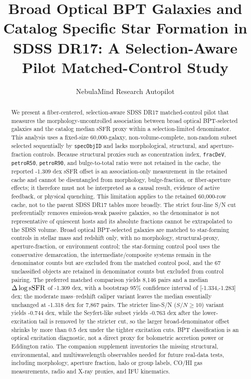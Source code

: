 \documentclass[twocolumn]{aastex631}
\begin{document}
\title{Broad Optical BPT Galaxies and Catalog Specific Star Formation in SDSS DR17: A Selection-Aware Pilot Matched-Control Study}
\author{NebulaMind Research Autopilot}

\begin{abstract}
We present a fiber-centered, selection-aware SDSS DR17 matched-control pilot that measures the morphology-uncontrolled association between broad optical BPT-selected galaxies and the catalog median sSFR proxy within a selection-limited denominator. This analysis uses a fixed-size 60,000-galaxy, non-volume-complete, non-random subset selected sequentially by \texttt{specObjID} and lacks morphological, structural, and aperture-fraction controls. Because structural proxies such as concentration index, \texttt{fracDeV}, \texttt{petroR50}, \texttt{petroR90}, and bulge-to-total ratio were not retained in the cache, the reported -1.309 dex sSFR offset is an association-only measurement in the retained cache and cannot be disentangled from morphology, bulge-fraction, or fiber-aperture effects; it therefore must not be interpreted as a causal result, evidence of active feedback, or physical quenching. This limitation applies to the retained 60,000-row cache, not to the parent SDSS DR17 tables more broadly. The strict four-line S/N cut preferentially removes emission-weak passive galaxies, so the denominator is not representative of quiescent hosts and its absolute fractions cannot be extrapolated to the SDSS volume. Broad optical BPT-selected galaxies are matched to star-forming controls in stellar mass and redshift only, with no morphology, structural-proxy, aperture-fraction, or environment control; the star-forming control pool uses the conservative \citep{kauffmann2003bpt} demarcation, the intermediate/composite systems remain in the denominator counts but are excluded from the matched control pool, and the 67 unclassified objects are retained in denominator counts but excluded from control pairing. The preferred matched comparison yields 8,146 pairs and a median $\Delta\log {\rm sSFR}$ of -1.309 dex, with a bootstrap 95\% confidence interval of [-1.334,-1.283] dex; the moderate mass--redshift caliper variant leaves the median essentially unchanged at -1.318 dex for 7,867 pairs. The stricter line-S/N ($S/N \geq 10$) variant yields -0.744 dex, while the Seyfert-like subset yields -0.763 dex after the lower-excitation tail is removed by the stricter cut, so the larger broad-denominator offset shrinks by more than 0.5 dex under the tighter excitation cuts. BPT classification is an optical excitation diagnostic, not a direct proxy for bolometric accretion power or Eddington ratio. The companion supplement inventories the missing structural, environmental, and multiwavelength observables needed for future real-data tests, including morphology, aperture fraction, halo or group labels, CO/HI gas measurements, radio and X-ray proxies, and IFU kinematics.
\end{abstract}
\end{document}
